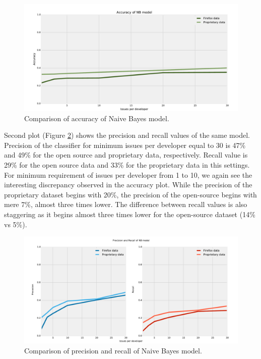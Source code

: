 \begin{figure}[htbp]
    \centering
        \includegraphics[width=\textwidth]{./images/prop_vs_os/nb_accuracy.pdf}
    \caption{Comparison of accuracy of Naive Bayes model.}
    \label{fig:results.datasets.nb_accuracy}
\end{figure}

Second plot (Figure \ref{fig:results.datasets.nb_pr}) shows the precision and recall values of the same model. Precision of the classifier for minimum issues per developer equal to 30 is 47\% and 49\% for the open source and proprietary data, respectively. Recall value is 29\% for the open source data and 33\% for the proprietary data in this settings. For minimum requirement of issues per developer from 1 to 10, we again see the interesting discrepancy observed in the accuracy plot. While the precision of the proprietary dataset begins with 20\%, the precision of the open-source begins with mere 7\%, almost three times lower. The difference between recall values is also staggering as it begins almost three times lower for the open-source dataset (14\% vs 5\%).

\begin{figure}[htbp]
    \centering
        \includegraphics[width=\textwidth]{./images/prop_vs_os/nb_precision_and_recall.pdf}
    \caption{Comparison of precision and recall of Naive Bayes model.}
    \label{fig:results.datasets.nb_pr}
\end{figure}

